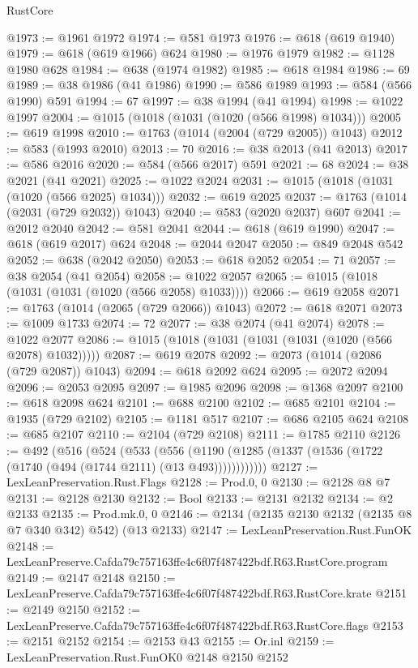 \begin{lexlean}{RustCore}
\begin{coremodule}
@1973 := @1961 @1972
@1974 := @581 @1973
@1976 := @618 (@619 @1940)
@1979 := @618 (@619 @1966) @624
@1980 := @1976 @1979
@1982 := @1128 @1980 @628
@1984 := @638 (@1974 @1982)
@1985 := @618 @1984
@1986 := 69
@1989 := @38 @1986 (@41 @1986)
@1990 := @586 @1989
@1993 := @584 (@566 @1990) @591
@1994 := 67
@1997 := @38 @1994 (@41 @1994)
@1998 := @1022 @1997
@2004 := @1015 (@1018 (@1031 (@1020 (@566 @1998) @1034)))
@2005 := @619 @1998
@2010 := @1763 (@1014 (@2004 (@729 @2005)) @1043)
@2012 := @583 (@1993 @2010)
@2013 := 70
@2016 := @38 @2013 (@41 @2013)
@2017 := @586 @2016
@2020 := @584 (@566 @2017) @591
@2021 := 68
@2024 := @38 @2021 (@41 @2021)
@2025 := @1022 @2024
@2031 := @1015 (@1018 (@1031 (@1020 (@566 @2025) @1034)))
@2032 := @619 @2025
@2037 := @1763 (@1014 (@2031 (@729 @2032)) @1043)
@2040 := @583 (@2020 @2037) @607
@2041 := @2012 @2040
@2042 := @581 @2041
@2044 := @618 (@619 @1990)
@2047 := @618 (@619 @2017) @624
@2048 := @2044 @2047
@2050 := @849 @2048 @542
@2052 := @638 (@2042 @2050)
@2053 := @618 @2052
@2054 := 71
@2057 := @38 @2054 (@41 @2054)
@2058 := @1022 @2057
@2065 := @1015 (@1018 (@1031 (@1031 (@1020 (@566 @2058) @1033))))
@2066 := @619 @2058
@2071 := @1763 (@1014 (@2065 (@729 @2066)) @1043)
@2072 := @618 @2071
@2073 := @1009 @1733
@2074 := 72
@2077 := @38 @2074 (@41 @2074)
@2078 := @1022 @2077
@2086 := @1015 (@1018 (@1031 (@1031 (@1031 (@1020 (@566 @2078) @1032)))))
@2087 := @619 @2078
@2092 := @2073 (@1014 (@2086 (@729 @2087)) @1043)
@2094 := @618 @2092 @624
@2095 := @2072 @2094
@2096 := @2053 @2095
@2097 := @1985 @2096
@2098 := @1368 @2097
@2100 := @618 @2098 @624
@2101 := @688 @2100
@2102 := @685 @2101
@2104 := @1935 (@729 @2102)
@2105 := @1181 @517
@2107 := @686 @2105 @624
@2108 := @685 @2107
@2110 := @2104 (@729 @2108)
@2111 := @1785 @2110
@2126 := @492
    (@516
      (@524
        (@533
          (@556 (@1190 (@1285 (@1337 (@1536 (@1722 (@1740 (@494 (@1744 @2111) (@13 @493))))))))))))
@2127 := LexLeanPreservation.Rust.Flags
@2128 := Prod.{0, 0}
@2130 := @2128 @8 @7
@2131 := @2128 @2130
@2132 := Bool
@2133 := @2131 @2132
@2134 := @2 @2133
@2135 := Prod.mk.{0, 0}
@2146 := @2134 (@2135 @2130 @2132 (@2135 @8 @7 @340 @342) @542) (@13 @2133)
@2147 := LexLeanPreservation.Rust.FunOK
@2148 := LexLeanPreserve.Cafda79c757163ffe4c6f07f487422bdf.R63.RustCore.program
@2149 := @2147 @2148
@2150 := LexLeanPreserve.Cafda79c757163ffe4c6f07f487422bdf.R63.RustCore.krate
@2151 := @2149 @2150
@2152 := LexLeanPreserve.Cafda79c757163ffe4c6f07f487422bdf.R63.RustCore.flags
@2153 := @2151 @2152
@2154 := @2153 @43
@2155 := Or.inl
@2159 := LexLeanPreservation.Rust.FunOK0 @2148 @2150 @2152

\end{coremodule}
\end{lexlean}
